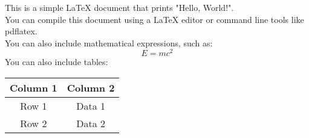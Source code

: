 \documentclass{article}
\begin{document}
This is a simple LaTeX document that prints "Hello, World!".\\
You can compile this document using a LaTeX editor or command line tools like pdflatex.\\
You can also include mathematical expressions, such as:\\
\[
E = mc^2
\]
You can also include tables:
\begin{tabular}{|c|c|}
    \hline
    Column 1 & Column 2 \\
    \hline
    Row 1 & Data 1 \\
    Row 2 & Data 2 \\
    \hline
\end{tabular}
\end{document}
